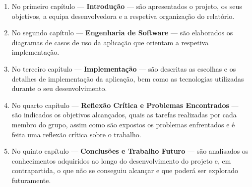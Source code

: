 \begin{enumerate}
\item No primeiro capítulo --- \textbf{Introdução} --- são apresentados o projeto, os seus objetivos, a equipa desenvolvedora e a respetiva organização do relatório.

\item No segundo capítulo --- \textbf{Engenharia de Software} --- são elaborados os diagramas de casos de uso da aplicação que orientam a respetiva implementação.

\item No terceiro capítulo --- \textbf{Implementação} --- são descritas as escolhas e os detalhes de implementação da aplicação, bem como as tecnologias utilizadas durante o seu desenvolvimento.

\item No quarto capítulo --- \textbf{Reflexão Crítica e Problemas Encontrados} --- são indicados os objetivos alcançados, quais as tarefas realizadas por cada membro do grupo, assim como são expostos os problemas enfrentados e é feita uma reflexão crítica sobre o trabalho.

\item No quinto capítulo --- \textbf{Conclusões e Trabalho Futuro} --- são analisados os conhecimentos adquiridos ao longo do desenvolvimento do projeto e, em contrapartida, o que não se conseguiu alcançar e que poderá ser explorado futuramente.
\end{enumerate}
